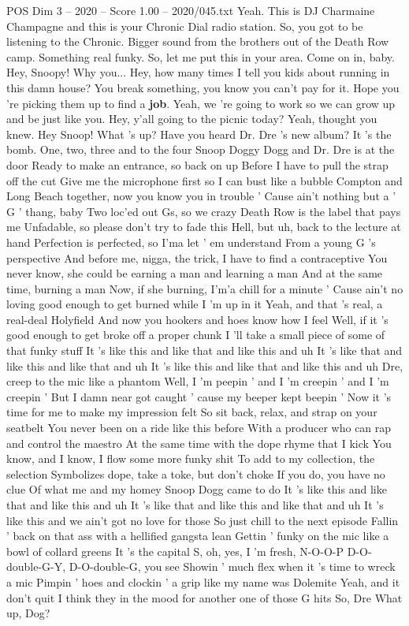 \begin{textsample}{POS Dim 3 – 2020 – Score 1.00 – 2020/045.txt}  \label{ex:f3_pos_009}
Yeah.
This is DJ Charmaine Champagne and this is your Chronic Dial radio station.
So, you got to be listening to the Chronic.
Bigger sound from the brothers out of the Death Row camp.
Something real funky.
So, let me put this in your area.
Come on in, baby.
Hey, Snoopy!
Why you...
Hey, how many times I tell you kids about running in this damn house?
You break something, you know you can't pay for it.
Hope you 're picking them up to find a \textbf{job}.
Yeah, we 're going to work so we can grow up and be just like you.
Hey, y'all going to the picnic today?
Yeah, thought you knew.
Hey Snoop!
What 's up?
Have you heard Dr.
Dre 's new album?
It 's the bomb.
One, two, three and to the four Snoop Doggy Dogg and Dr.
Dre is at the door Ready to make an entrance, so back on up Before I have to pull the strap off the cut Give me the microphone first so I can bust like a bubble Compton and Long Beach together, now you know you in trouble ' Cause ain't nothing but a ' G ' thang, baby Two loc'ed out Gs, so we crazy Death Row is the label that pays me Unfadable, so please don't try to fade this Hell, but uh, back to the lecture at hand Perfection is perfected, so I'ma let ' em understand From a young G 's perspective And before me, nigga, the trick, I have to find a contraceptive You never know, she could be earning a man and learning a man And at the same time, burning a man Now, if she burning, I'm'a chill for a minute ' Cause ain't no loving good enough to get burned while I 'm up in it Yeah, and that 's real, a real-deal Holyfield And now you hookers and hoes know how I feel Well, if it 's good enough to get broke off a proper chunk I 'll take a small piece of some of that funky stuff It 's like this and like that and like this and uh It 's like that and like this and like that and uh It 's like this and like that and like this and uh Dre, creep to the mic like a phantom Well, I 'm peepin ' and I 'm creepin ' and I 'm creepin ' But I damn near got caught ' cause my beeper kept beepin ' Now it 's time for me to make my impression felt So sit back, relax, and strap on your seatbelt You never been on a ride like this before With a producer who can rap and control the maestro At the same time with the dope rhyme that I kick You know, and I know, I flow some more funky shit To add to my collection, the selection Symbolizes dope, take a toke, but don't choke If you do, you have no clue Of what me and my homey Snoop Dogg came to do It 's like this and like that and like this and uh It 's like that and like this and like that and uh It 's like this and we ain't got no love for those So just chill to the next episode Fallin ' back on that ass with a hellified gangsta lean Gettin ' funky on the mic like a bowl of collard greens It 's the capital S, oh, yes, I 'm fresh, N-O-O-P D-O-double-G-Y, D-O-double-G, you see Showin ' much flex when it 's time to wreck a mic Pimpin ' hoes and clockin ' a grip like my name was Dolemite Yeah, and it don't quit I think they in the mood for another one of those G hits So, Dre What up, Dog?

\end{textsample}

